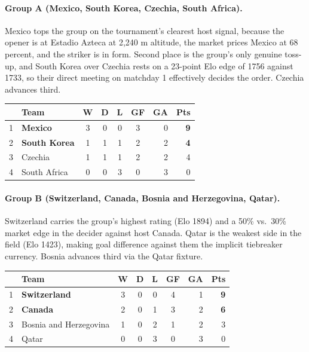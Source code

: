 \documentclass[11pt,letterpaper]{article}
\begin{document}
\paragraph{Group A (Mexico, South Korea, Czechia, South Africa).} Mexico tops the group on the tournament's clearest host signal, because the opener is at Estadio Azteca at 2{,}240 m altitude, the market prices Mexico at 68 percent, and the striker is in form. Second place is the group's only genuine toss-up, and South Korea over Czechia rests on a 23-point Elo edge of 1756 against 1733, so their direct meeting on matchday 1 effectively decides the order. Czechia advances third.
\smallskip{}\\[1pt]
{\footnotesize
\begin{tabular}{@{}clccccrr@{}}
\toprule
 & Team & W & D & L & GF & GA & Pts \\
\midrule
1 & \textbf{Mexico} & 3 & 0 & 0 & 3 & 0 & \textbf{9} \\
2 & \textbf{South Korea} & 1 & 1 & 1 & 2 & 2 & \textbf{4} \\
3 & Czechia & 1 & 1 & 1 & 2 & 2 & 4 \\
4 & South Africa & 0 & 0 & 3 & 0 & 3 & 0 \\
\bottomrule
\end{tabular}}\smallskip

\paragraph{Group B (Switzerland, Canada, Bosnia and Herzegovina, Qatar).} Switzerland carries the group's highest rating (Elo 1894) and a 50\% vs.\ 30\% market edge in the decider against host Canada. Qatar is the weakest side in the field (Elo 1423), making goal difference against them the implicit tiebreaker currency. Bosnia advances third via the Qatar fixture.
\smallskip{}\\[1pt]
{\footnotesize
\begin{tabular}{@{}clccccrr@{}}
\toprule
 & Team & W & D & L & GF & GA & Pts \\
\midrule
1 & \textbf{Switzerland} & 3 & 0 & 0 & 4 & 1 & \textbf{9} \\
2 & \textbf{Canada} & 2 & 0 & 1 & 3 & 2 & \textbf{6} \\
3 & Bosnia and Herzegovina & 1 & 0 & 2 & 1 & 2 & 3 \\
4 & Qatar & 0 & 0 & 3 & 0 & 3 & 0 \\
\bottomrule
\end{tabular}}\smallskip
\end{document}
